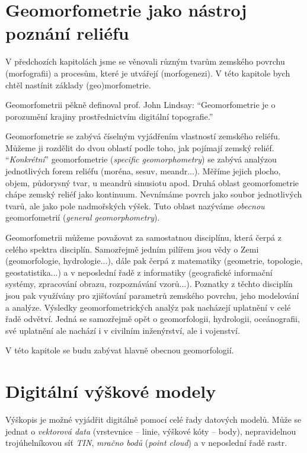 \section{Geomorfometrie jako nástroj poznání reliéfu}
V předchozích kapitolách jsme se věnovali různým tvarům zemského povrchu (morfografii) a procesům, které je utvářejí (morfogenezi). V této kapitole bych chtěl nastínit základy (geo)morfometrie. 

Geomorfometrii pěkně definoval prof. John Lindsay: \enquote{Geomorfometrie je o porozumění krajiny prostřednictvím digitální topografie.}

Geomorfometrie se zabývá číselným vyjádřením vlastností zemského reliéfu. Můžeme ji rozdělit do dvou oblastí podle toho, jak pojímají zemský reliéf. \enquote{\emph{Konkrétní}} geomorfometrie (\textit{specific geomorphometry}) se zabývá analýzou jednotlivých forem reliéfu (moréna, sesuv, meandr...). Měříme jejich plocho, objem, půdorysný tvar, u meandrů sinusiotu apod. Druhá oblast geomorfometrie chápe zemský reliéf jako kontinuum. Nevnímáme povrch jako soubor jednotlivých tvarů, ale jako pole nadmořských výšek. Tuto oblast nazýváme \emph{obecnou} geomorfometrií (\textit{general geomorphometry}).

Geomorfometrii můžeme považovat za samostatnou disciplínu, která čerpá z celého spektra disciplín. Samozřejmě jedním pilířem jsou vědy o Zemi (geomorfologie, hydrologie...), dále pak čerpá z matematiky (geometrie, topologie, geostatistika...) a v neposlední řadě z informatiky (geografické informační systémy, zpracování obrazu, rozpoznávání vzorů...). Poznatky z těchto disciplín jsou pak využívány pro zjišťování parametrů zemského povrchu, jeho modelování a analýze. Výsledky geomorfometrických analýz pak nacházejí uplatnění v celé řadě odvětví. Jedná se samozřejmě opět o geomorfologii, hydrologii, oceánografii, své uplatnění ale nachází i v civilním inženýrství, ale i vojenství. 

V této kapitole se budu zabývat hlavně obecnou geomorfologií.

\section{Digitální výškové modely}
Výškopis je možné vyjádřit digitálně pomocí celé řady datových modelů. Může se jednat o \emph{vektorová data} (vrstevnice -- linie, výškové kóty -- body), nepravidelnou trojúhelníkovou síť \emph{TIN}, \emph{mračno bodů} (\textit{point cloud}) a v neposlední řadě rastr.

